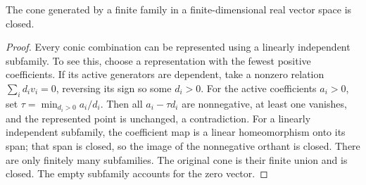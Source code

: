 \begin{lemma}\label{lem:finite-cone}
The cone generated by a finite family in a finite-dimensional real vector
space is closed.
\end{lemma}
\begin{proof}
Every conic combination can be represented using a linearly independent
subfamily. To see this, choose a representation with the fewest positive
coefficients. If its active generators are dependent, take a nonzero
relation $\sum_i d_i v_i=0$, reversing its sign so some $d_i>0$.
For the active coefficients $a_i>0$, set
$\tau=\min_{d_i>0}a_i/d_i$. Then all $a_i-\tau d_i$ are nonnegative,
at least one vanishes, and the represented point is unchanged, a
contradiction. For a linearly independent subfamily, the coefficient
map is a linear homeomorphism onto its span; that span is closed, so
the image of the nonnegative orthant is closed. There are only finitely
many subfamilies. The original cone is their finite union and is closed.
The empty subfamily accounts for the zero vector.
\end{proof}

